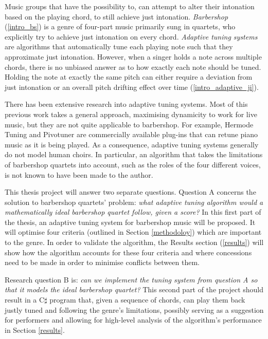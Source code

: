 \documentclass[a4paper]{article}
\begin{document}
Music groups that have the possibility to, can attempt to alter their intonation based on the playing chord, to still achieve just intonation. \textit{Barbershop} (\ref{intro_bs}) is a genre of four-part music primarily sung in quartets, who explicitly try to achieve just intonation on every chord. \cite{barbershop_harmony_society_contest_2022, averill_bell_1999} \textit{Adaptive tuning systems} are algorithms that automatically tune each playing note such that they approximate just intonation. \cite{sethares_adaptive_1994} However, when a singer holds a note across multiple chords, there is no unbiased answer as to how exactly each note should be tuned. Holding the note at exactly the same pitch can either require a deviation from just intonation or an overall pitch drifting effect over time (\ref{intro_adaptive_ji}).

There has been extensive research into adaptive tuning systems. \cite{sethares_adaptive_2005} Most of this previous work takes a general approach, maximising dynamicity to work for live music, but they are not quite applicable to barbershop. For example, Hermode Tuning \cite{mohrlok_hermode_2003} and Pivotuner \cite{volkov_pivotuner_2022} are commercially available plug-ins that can retune piano music as it is being played. As a consequence, adaptive tuning systems generally do not model human choirs. In particular, an algorithm that takes the limitations of barbershop quartets into account, such as the roles of the four different voices, is not known to have been made to the author.

This thesis project will answer two separate questions. Question A concerns the solution to barbershop quartets' problem: {\it what adaptive tuning algorithm would a mathematically ideal barbershop quartet follow, given a score?} In this first part of the thesis, an adaptive tuning system for barbershop music will be proposed. It will optimise four criteria (outlined in Section \ref{methodoloy}) which are important to the genre. In order to validate the algorithm, the Results section (\ref{results}) will show how the algorithm accounts for these four criteria and where concessions need to be made in order to minimise conflicts between them.

Research question B is: {\it can we implement the tuning system from question A so that it models the ideal barbershop quartet?} This second part of the project should result in a C$\sharp$ program that, given a sequence of chords, can play them back justly tuned and following the genre's limitations, possibly serving as a suggestion for performers and allowing for high-level analysis of the algorithm's performance in Section \ref{results}.
\end{document}
